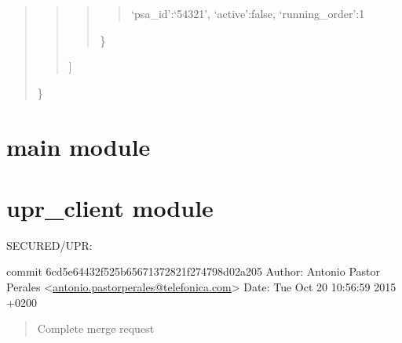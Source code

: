 \documentclass[letterpaper,10pt,oneside]{sphinxmanual}
\begin{document}
\begin{fulllineitems}
\begin{fulllineitems}
\begin{quote}
\begin{quote}
\begin{quote}
\begin{quote}
`psa\_id':`54321',
`active':false,
`running\_order':1
\end{quote}

\}
\end{quote}

{]}
\end{quote}

\}
\end{quote}

\end{fulllineitems}


\begin{fulllineitems}
\label{client:client.UPRClient.update_group}
\end{fulllineitems}


\begin{fulllineitems}
\label{client:client.UPRClient.update_user}
\end{fulllineitems}


\end{fulllineitems}



\chapter{main module}
\label{main:main-module}\label{main::doc}

\chapter{upr\_client module}
\label{upr_client:module-upr_client}\label{upr_client::doc}\label{upr_client:upr-client-module}
SECURED/UPR:

commit 6cd5e64432f525b65671372821f274798d02a205
Author: Antonio Pastor Perales \textless{}\href{mailto:antonio.pastorperales@telefonica.com}{antonio.pastorperales@telefonica.com}\textgreater{}
Date:   Tue Oct 20 10:56:59 2015 +0200
\begin{quote}

Complete merge request
\end{quote}
\end{document}
